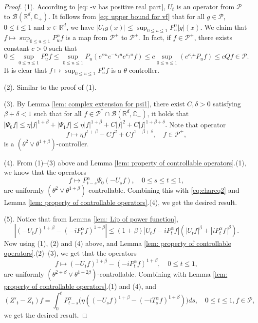 \documentclass[12pt,a4paper]{amsart}
\theoremstyle{plain}
\theoremstyle{definition}
\numberwithin{equation}{section}
\begin{document}
\begin{proof}
  (1). According to \eqref{eq: -v has positive real part}, $U_t$ is an operator from $\mathcal P$ to $\mathcal B(\mathbb R^d, \mathbb C_+)$.
  It follows from \eqref{eq: upper bound for vf} that for all $g\in \mathcal P$, $0\leq t\leq 1$ and $x\in \mathbb R^d$, we have
  \(
    |U_t g(x)|
    \leq \sup_{0\leq u\leq 1}P_u^\alpha |g| (x).
  \)
  We claim that $f\mapsto\sup_{0\leq u\leq 1}P^{\alpha}_u f$ is a map from $\mathcal P^+$ to $\mathcal P^+$. In fact, if $f\in \mathcal P^+$, there exists constant $c>0$ such that
  \[
    0
    \leq \sup_{0\leq u\leq 1}P^{\alpha}_u f
    \leq \sup_{0\leq u\leq 1} P_u (e^{\alpha u} e^{-\kappa_f u} e^{\kappa_f u} f )
    \leq c \sup_{0\leq u\leq 1} (e^{\kappa_fu}P_u f) \leq c Qf \in \mathcal P.
  \]
	It is clear that $f\mapsto\sup_{0\leq u\leq 1}P^{\alpha}_u f$ is a $\theta$-controller.
  
  (2). Similar to the proof of (1).
  
  (3). By Lemma \ref{lem: complex extension for psi1}, there exist $C, \delta >0$ satisfying $\beta+\delta< 1$ such that for all $ f \in \mathcal P^* \cap \mathcal B( \mathbb R^d, \mathbb C_+ )$, it holds that
\(    
|\Psi_0 f|
      \leq \eta |f|^{1+\beta} + |\Psi_1 f|
      \leq \eta |f|^{1+\beta} + C|f|^2+ C |f|^{1+\beta + \delta}.
\)
  Note that operator
  \[
    f \mapsto \eta f^{1+\beta} + Cf^2+ Cf^{1+\beta + \delta}
    , \quad f\in \mathcal P^+,
  \]
  is a $(\theta^2 \vee \theta^{1+\beta})$-controller.
  
  (4). 
  From (1)--(3) above and Lemma \ref{lem: property of controllable operators}.(1), we know that the operators
  \[
    f \mapsto P^\alpha_{t-s}\Psi_0(-U_sf)
    , \quad 0\leq s\leq t\leq 1,
  \]
  are uniformly $(\theta^2\vee \theta^{1+\beta})$-controllable.
  Combining this with \eqref{eq:chareq2} and 
  Lemma \ref{lem: property of controllable operators}.(4), we get the desired result.
  
  (5). Notice that from Lemma \ref{lem: Lip of power function},
  \[
    |(-U_t f)^{1+\beta} - (-iP^\alpha_t f)^{1+\beta} |
    \leq  (1+\beta) |U_t f-iP^\alpha_t f|(|U_t f|^{\beta}+|i P^\alpha_t f|^{\beta}).
  \]
  Now using (1), (2) and  (4) above, and Lemma \ref{lem: property of controllable operators}.(2)--(3), we get that the operators
  \[
    f \mapsto (-U_t f)^{1+\beta} - (-iP^\alpha_t f)^{1+\beta},\quad 0\leq t\leq 1,
  \]
  are uniformly $(\theta^{2+\beta}\vee \theta^{1+2\beta})$-controllable.
  Combining with Lemma \ref{lem: property of controllable operators}.(1) and (4), and
  \begin{equation}
    (Z'_t - Z_t)f 
    = \int_0^t P^\alpha_{t-s}\Big( \eta ((-U_s f)^{1+\beta} - (-iT_s^\alpha f)^{1+\beta} )\Big)ds
    , \quad 0\leq t\leq 1, f\in \mathcal P,
  \end{equation}
  we get the desired result.
  

\end{proof}
\end{document}
